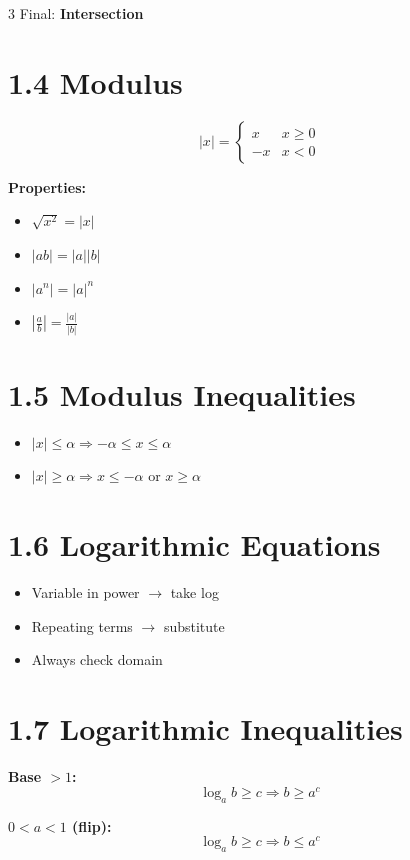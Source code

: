 \documentclass[11pt,a4paper,landscape]{article}
\begin{document}
\begin{multicols*}{3}
Final: \textbf{Intersection}

\section*{1.4 Modulus}

$$
|x|=
\begin{cases}
x & x \ge 0 \\
-x & x < 0
\end{cases}
$$

\textbf{Properties:}
\begin{itemize}
\item $\sqrt{x^2} = |x|$
\item $|ab| = |a||b|$
\item $|a^n| = |a|^n$
\item $\left|\frac{a}{b}\right| = \frac{|a|}{|b|}$
\end{itemize}

\section*{1.5 Modulus Inequalities}

\begin{itemize}
\item $|x| \le \alpha \Rightarrow -\alpha \le x \le \alpha$
\item $|x| \ge \alpha \Rightarrow x \le -\alpha$ or $x \ge \alpha$
\end{itemize}

\section*{1.6 Logarithmic Equations}

\begin{itemize}
\item Variable in power $\rightarrow$ take log
\item Repeating terms $\rightarrow$ substitute
\item Always check domain
\end{itemize}

\section*{1.7 Logarithmic Inequalities}

\textbf{Base $>1$:}
$$
\log_a b \ge c \Rightarrow b \ge a^c
$$

\textbf{$0<a<1$ (flip):}
$$
\log_a b \ge c \Rightarrow b \le a^c
$$


\end{multicols*}
\end{document}
